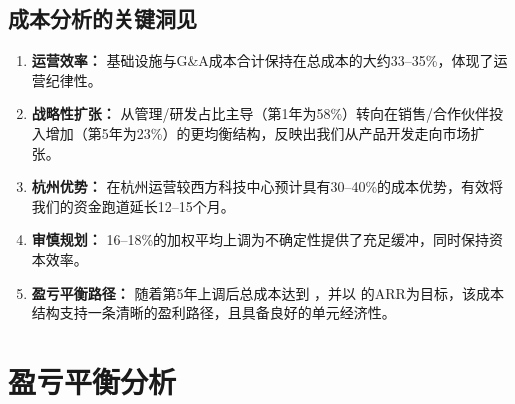 \documentclass[11pt, a4paper, oneside]{article}
\begin{document}
\begin{table}[H]
\centering
\caption{基础设施与平台投资回报}
\label{tab:infrastructure_roi}
\end{table}

\subsection{成本分析的关键洞见}

\begin{enumerate}
    \item \textbf{运营效率：} 基础设施与G\&A成本合计保持在总成本的大约33--35\%，体现了运营纪律性。
    
    \item \textbf{战略性扩张：} 从管理/研发占比主导（第1年为58\%）转向在销售/合作伙伴投入增加（第5年为23\%）的更均衡结构，反映出我们从产品开发走向市场扩张。
    
    \item \textbf{杭州优势：} 在杭州运营较西方科技中心预计具有30--40\%的成本优势，有效将我们的资金跑道延长12--15个月。
    
    \item \textbf{审慎规划：} 16--18\%的加权平均上调为不确定性提供了充足缓冲，同时保持资本效率。
    
    \item \textbf{盈亏平衡路径：} 随着第5年上调后总成本达到 ，并以  的ARR为目标，该成本结构支持一条清晰的盈利路径，且具备良好的单元经济性。
\end{enumerate}



\section{盈亏平衡分析}
\end{document}
